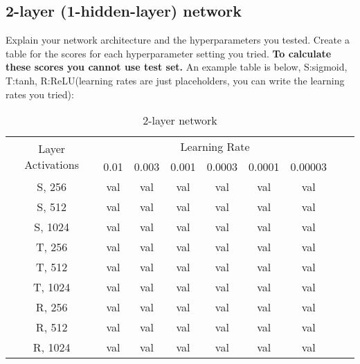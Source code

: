 \documentclass{article}
\begin{document}
\newpage
\subsection{2-layer (1-hidden-layer) network}
Explain your network architecture and the hyperparameters you tested. Create a table for the scores for each hyperparameter setting you tried. \textbf{To calculate these scores you cannot use test set.} An example table is below, S:sigmoid, T:tanh, R:ReLU(learning rates are just placeholders, you can write the learning rates you tried):\\
\begin{table}[htbp]
    \centering
    \begin{tabular}{|c|c|c|c|c|c|c|c|c|}
    \hline
    \multirow{2}{5em}{Layer Activations} & \multicolumn{6}{c|}{Learning Rate} \\
        & 0.01 & 0.003 & 0.001 & 0.0003 & 0.0001 & 0.00003 \\
        \hline \hline
        S, 256  & val & val & val & val & val & val \\
        S, 512  & val & val & val & val & val & val \\
        S, 1024  & val & val & val & val & val & val \\
        T, 256  & val & val & val & val & val & val \\
        T, 512  & val & val & val & val & val & val \\
        T, 1024  & val & val & val & val & val & val \\
        R, 256  & val & val & val & val & val & val \\
        R, 512  & val & val & val & val & val & val \\
        R, 1024  & val & val & val & val & val & val \\
        \hline
    \end{tabular}
    \caption{2-layer network}
    \label{tab:2layer}
\end{table}


\newpage
\end{document}
